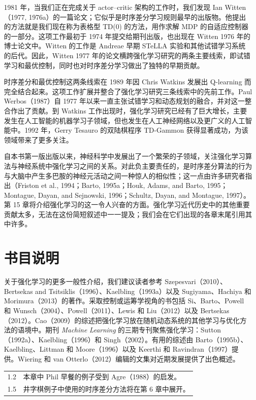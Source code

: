 \documentclass[UTF8,12pt,a4paper,fontset=fandol]{ctexart}
\begin{document}
1981 年，当我们正在完成关于 actor--critic 架构的工作时，我们发现 Ian Witten（1977, 1976a）的一篇论文；它似乎是时序差分学习规则最早的出版物。他提出的方法就是我们现在称为表格型 TD(0) 的方法，用作求解 MDP 的自适应控制器的一部分。这项工作最初于 1974 年提交给期刊出版，也出现在 Witten 1976 年的博士论文中。Witten 的工作是 Andreae 早期 STeLLA 实验和其他试错学习系统的后代。因此，Witten 1977 年的论文横跨强化学习研究的两条主要线索，即试错学习和最优控制，同时也对时序差分学习做出了独特的早期贡献。

时序差分和最优控制这两条线索在 1989 年因 Chris Watkins 发展出 Q-learning 而完全结合起来。这项工作扩展并整合了强化学习研究三条线索中的先前工作。Paul Werbos（1987）自 1977 年以来一直主张试错学习和动态规划的融合，并对这一整合作出了贡献。到 Watkins 工作出现时，强化学习研究已经有了巨大增长，主要发生在人工智能的机器学习子领域，但也发生在人工神经网络以及更广义的人工智能中。1992 年，Gerry Tesauro 的双陆棋程序 TD-Gammon 获得显著成功，为该领域带来了更多关注。

自本书第一版出版以来，神经科学中发展出了一个繁荣的子领域，关注强化学习算法与神经系统中强化学习之间的关系。对此负主要责任的，是时序差分算法的行为与大脑中产生多巴胺的神经元活动之间一种惊人的相似性；这一点由许多研究者指出（Friston et al., 1994；Barto, 1995a；Houk, Adams, and Barto, 1995；Montague, Dayan, and Sejnowski, 1996；Schultz, Dayan, and Montague, 1997）。第 15 章将介绍强化学习的这一令人兴奋的方面。强化学习近代历史中的其他重要贡献太多，无法在这份简短叙述中一一提及；我们会在它们出现的各章末尾引用其中许多。

\section*{书目说明}

关于强化学习的更多一般性介绍，我们建议读者参考 Szepesvari（2010）、Bertsekas and Tsitsiklis（1996）、Kaelbling（1993a）以及 Sugiyama、Hachiya 和 Morimura（2013）的著作。采取控制或运筹学视角的书包括 Si、Barto、Powell 和 Wunsch（2004）、Powell（2011）、Lewis 和 Liu（2012）以及 Bertsekas（2012）。Cao（2009）的综述把强化学习放在随机动态系统的其他学习与优化方法的语境中。期刊 \textit{Machine Learning} 的三期专刊聚焦强化学习：Sutton（1992a）、Kaelbling（1996）和 Singh（2002）。有用的综述由 Barto（1995b）、Kaelbling、Littman 和 Moore（1996）以及 Keerthi 和 Ravindran（1997）提供。Wiering 和 van Otterlo（2012）编辑的文集对近期发展提供了出色概述。

\begin{longtable}{p{}p{}}
1.2 & 本章中 Phil 早餐的例子受到 Agre（1988）的启发。 \\
1.5 & 井字棋例子中使用的时序差分方法将在第 6 章中展开。 \\
\end{longtable}
\end{document}
